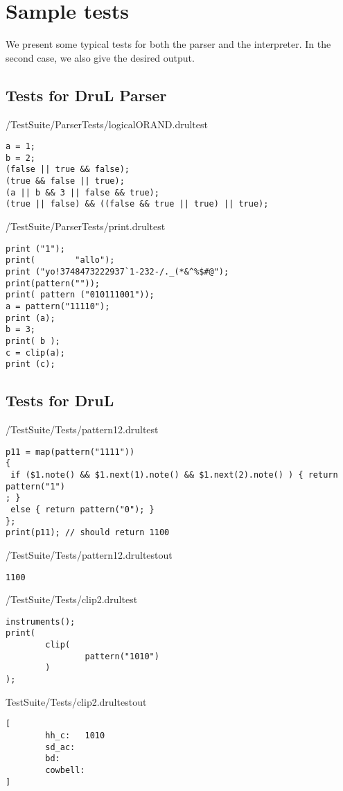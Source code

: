 \section{Sample tests} \label{ts:samples}
We present some typical tests for both the parser and the interpreter. In the
second case, we also give the desired output.

\subsection{Tests for DruL Parser}

/TestSuite/ParserTests/logicalORAND.drultest
{\color{red}
\begin{verbatim}
a = 1;
b = 2;
(false || true && false);
(true && false || true);
(a || b && 3 || false && true);
(true || false) && ((false && true || true) || true);
\end{verbatim}
}

/TestSuite/ParserTests/print.drultest
{\color{red}
\begin{verbatim}
print ("1");
print(        "allo");
print ("yo!3748473222937`1-232-/._(*&^%$#@");
print(pattern(""));
print( pattern ("010111001"));
a = pattern("11110");
print (a);
b = 3;
print( b );
c = clip(a);
print (c);
\end{verbatim}
}

\subsection{Tests for DruL}

/TestSuite/Tests/pattern12.drultest
{\color{red}
\begin{verbatim}
p11 = map(pattern("1111"))
{
 if ($1.note() && $1.next(1).note() && $1.next(2).note() ) { return pattern("1")
; }
 else { return pattern("0"); }
};
print(p11); // should return 1100
\end{verbatim}
}
/TestSuite/Tests/pattern12.drultestout
{\color{blue}
\begin{verbatim}
1100
\end{verbatim}
}


/TestSuite/Tests/clip2.drultest
{\color{red}
\begin{verbatim}
instruments();
print(
        clip(
                pattern("1010")
        )
);
\end{verbatim}
}
TestSuite/Tests/clip2.drultestout
{\color{blue}
\begin{verbatim}
[
        hh_c:   1010
        sd_ac:
        bd:
        cowbell:
]
\end{verbatim}
}



